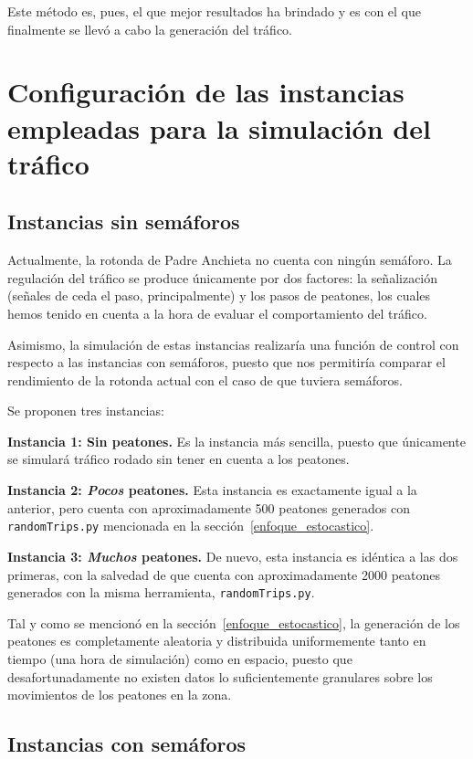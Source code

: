 Este método es, pues, el que mejor resultados ha brindado y es con el que finalmente se llevó a cabo la generación del tráfico.

\section{Configuración de las instancias empleadas para la simulación del tráfico}

\subsection{Instancias sin semáforos}

Actualmente, la rotonda de Padre Anchieta no cuenta con ningún semáforo. La regulación del tráfico se produce únicamente por dos factores: la señalización (señales de ceda el paso, principalmente) y los pasos de peatones, los cuales hemos tenido en cuenta a la hora de evaluar el comportamiento del tráfico.

Asimismo, la simulación de estas instancias realizaría una función de control con respecto a las instancias con semáforos, puesto que nos permitiría comparar el rendimiento de la rotonda actual con el caso de que tuviera semáforos.

Se proponen tres instancias:

\textbf{Instancia 1: Sin peatones.} Es la instancia más sencilla, puesto que únicamente se simulará tráfico rodado sin tener en cuenta a los peatones.

\textbf{Instancia 2: \textit{Pocos} peatones.} Esta instancia es exactamente igual a la anterior, pero cuenta con aproximadamente 500 peatones generados con \texttt{randomTrips.py} mencionada en la sección~\ref{enfoque_estocastico}.

\textbf{Instancia 3: \textit{Muchos} peatones.} De nuevo, esta instancia es idéntica a las dos primeras, con la salvedad de que cuenta con aproximadamente 2000 peatones generados con la misma herramienta, \texttt{randomTrips.py}.

Tal y como se mencionó en la sección~\ref{enfoque_estocastico}, la generación de los peatones es completamente aleatoria y distribuida uniformemente tanto en tiempo (una hora de simulación) como en espacio, puesto que desafortunadamente no existen datos lo suficientemente granulares sobre los movimientos de los peatones en la zona.


\subsection{Instancias con semáforos}

